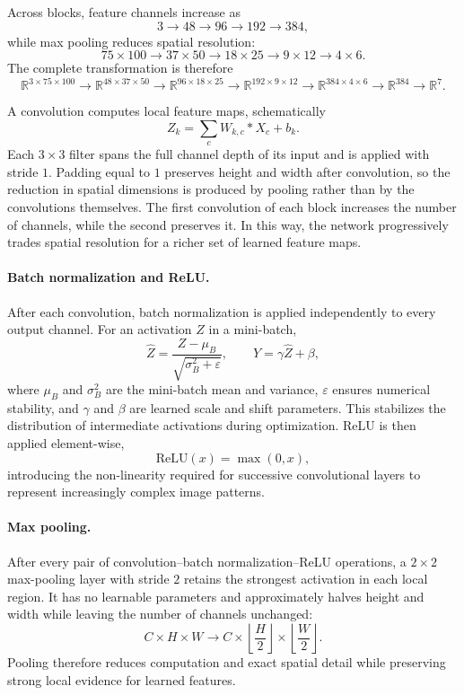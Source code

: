\documentclass[11pt,a4paper]{article}
\begin{document}
Across blocks, feature channels increase as
\[
3\rightarrow48\rightarrow96\rightarrow192\rightarrow384,
\]
while max pooling reduces spatial resolution:
\[
75\times100\rightarrow37\times50\rightarrow18\times25\rightarrow9\times12\rightarrow4\times6.
\]
The complete transformation is therefore
\[
\mathbb{R}^{3\times75\times100}\rightarrow
\mathbb{R}^{48\times37\times50}\rightarrow
\mathbb{R}^{96\times18\times25}\rightarrow
\mathbb{R}^{192\times9\times12}\rightarrow
\mathbb{R}^{384\times4\times6}\rightarrow
\mathbb{R}^{384}\rightarrow\mathbb{R}^{7}.
\]

A convolution computes local feature maps, schematically
\[
Z_k=\sum_c W_{k,c}*X_c+b_k.
\]
Each $3\times3$ filter spans the full channel depth of its input and is applied with stride $1$. Padding equal to $1$ preserves height and width after convolution, so the reduction in spatial dimensions is produced by pooling rather than by the convolutions themselves. The first convolution of each block increases the number of channels, while the second preserves it. In this way, the network progressively trades spatial resolution for a richer set of learned feature maps.

\paragraph{Batch normalization and ReLU.}
After each convolution, batch normalization is applied independently to every output channel. For an activation $Z$ in a mini-batch,
\[
\hat Z=\frac{Z-\mu_B}{\sqrt{\sigma_B^2+\varepsilon}},
\qquad Y=\gamma\hat Z+\beta,
\]
where $\mu_B$ and $\sigma_B^2$ are the mini-batch mean and variance, $\varepsilon$ ensures numerical stability, and $\gamma$ and $\beta$ are learned scale and shift parameters. This stabilizes the distribution of intermediate activations during optimization. ReLU is then applied element-wise,
\[
\mathrm{ReLU}(x)=\max(0,x),
\]
introducing the non-linearity required for successive convolutional layers to represent increasingly complex image patterns.

\paragraph{Max pooling.}
After every pair of convolution--batch normalization--ReLU operations, a $2\times2$ max-pooling layer with stride $2$ retains the strongest activation in each local region. It has no learnable parameters and approximately halves height and width while leaving the number of channels unchanged:
\[
C\times H\times W\rightarrow C\times\left\lfloor\frac{H}{2}\right\rfloor\times\left\lfloor\frac{W}{2}\right\rfloor.
\]
Pooling therefore reduces computation and exact spatial detail while preserving strong local evidence for learned features.
\end{document}
